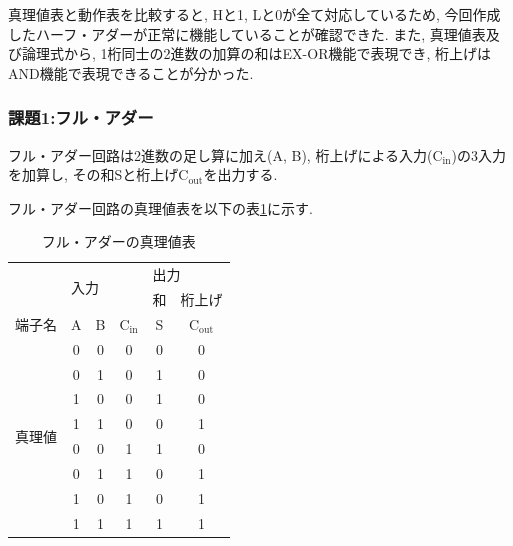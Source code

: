 \documentclass[a4paper, 11pt, uplatex]{jsarticle}
\begin{document}
真理値表と動作表を比較すると,  Hと1,  Lと0が全て対応しているため,  今回作成したハーフ・アダーが正常に機能していることが確認できた.
また,  真理値表及び論理式から,  1桁同士の2進数の加算の和はEX-OR機能で表現でき,  桁上げはAND機能で表現できることが分かった.

\subsubsection{課題1:フル・アダー}
フル・アダー回路は2進数の足し算に加え(A,  B),  桁上げによる入力($\mathrm{C_{in}}$)の3入力を加算し,  その和Sと桁上げ$\mathrm{C_{out}}$を出力する.

フル・アダー回路の真理値表を以下の表\ref{フルアダー真理値表}に示す.
\begin{table}[H]
  \begin{center}
  \caption{フル・アダーの真理値表}
  \label{フルアダー真理値表}
\begin{tabular}{|c|c|c|c|c|c|}
  \hline
                      & \multicolumn{3}{l|}{\multirow{2}{*}{入力}} & \multicolumn{2}{l|}{出力} \\ \cline{5-6}
                      & \multicolumn{3}{l|}{}                    & 和          & 桁上げ        \\ \hline
  端子名                 & A         & B        &$\mathrm{C_{in}}$       & S        & $\mathrm{C_{out}}$          \\ \hline \hline
  \multirow{8}{*}{真理値} & 0          &0         & 0          & 0      &0   \\
                       & 0          &1         & 0          & 1      &0    \\
                       & 1          &0         & 0          & 1      &0    \\
                       & 1          &1         & 0          & 0      &1    \\
                       & 0          &0         & 1          & 1      &0    \\
                       & 0          &1         &1           &0       &1    \\
                       & 1          &0         &1           &0       &1    \\
                       & 1          &1         &1           &1       &1    \\ \hline
\end{tabular}
\end{center}
\end{table}
\end{document}
